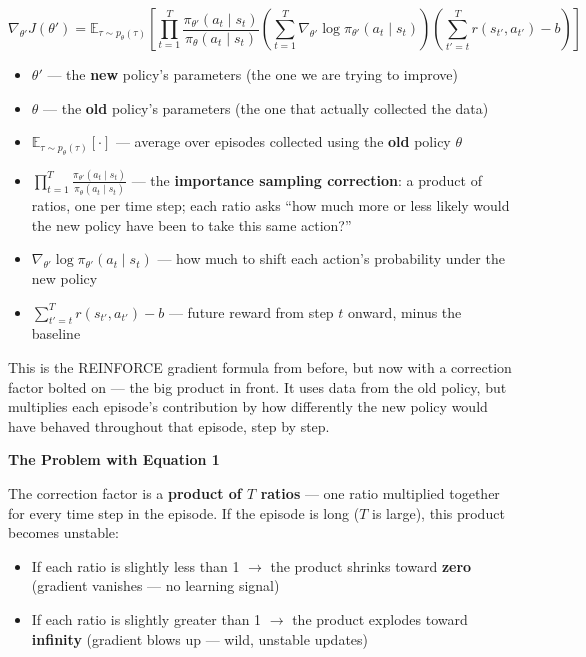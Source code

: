\[
\nabla_{\theta'} J(\theta')
=
\mathbb{E}_{\tau \sim p_\theta(\tau)}
\left[
  \prod_{t=1}^T
  \frac{\pi_{\theta'}(a_t \mid s_t)}{\pi_\theta(a_t \mid s_t)}
  \left( \sum_{t=1}^T \nabla_{\theta'} \log \pi_{\theta'}(a_t \mid s_t) \right)
  \left( \sum_{t'=t}^T r(s_{t'}, a_{t'}) - b \right)
\right]
\]

\begin{itemize}
  \item $\theta'$ --- the \textbf{new} policy's parameters (the one we are trying to improve)
  \item $\theta$ --- the \textbf{old} policy's parameters (the one that actually collected the
    data)
  \item $\mathbb{E}_{\tau \sim p_\theta(\tau)}[\cdot]$ --- average over episodes collected using
    the \textbf{old} policy $\theta$
  \item $\prod_{t=1}^T \frac{\pi_{\theta'}(a_t \mid s_t)}{\pi_\theta(a_t \mid s_t)}$ --- the
    \textbf{importance sampling correction}: a product of ratios, one per time step; each ratio
    asks ``how much more or less likely would the new policy have been to take this same action?''
  \item $\nabla_{\theta'} \log \pi_{\theta'}(a_t \mid s_t)$ --- how much to shift each action's
    probability under the new policy
  \item $\sum_{t'=t}^T r(s_{t'}, a_{t'}) - b$ --- future reward from step $t$ onward, minus the
    baseline
\end{itemize}

This is the REINFORCE gradient formula from before, but now with a correction factor bolted on ---
the big product in front. It uses data from the old policy, but multiplies each episode's
contribution by how differently the new policy would have behaved throughout that episode, step by
step.

\textbf{The Problem with Equation 1}

The correction factor is a \textbf{product of $T$ ratios} --- one ratio multiplied together for
every time step in the episode. If the episode is long ($T$ is large), this product becomes
unstable:

\begin{itemize}
  \item If each ratio is slightly less than 1 $\to$ the product shrinks toward \textbf{zero}
    (gradient vanishes --- no learning signal)
  \item If each ratio is slightly greater than 1 $\to$ the product explodes toward
    \textbf{infinity} (gradient blows up --- wild, unstable updates)
\end{itemize}

